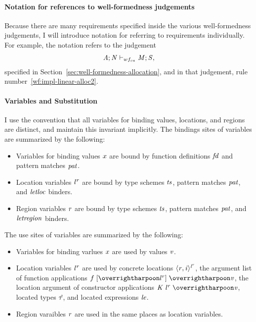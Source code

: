 \paragraph{Notation for references to well-formedness judgements}
Because there are many requirements specified inside the various
well-formedness judgements, I will introduce notation for referring
to requirements individually.
%
For example, the notation
refers to the judgement
\begin{align*}
\mathit{A};\mathit{N} \vdash_{wf_{ca}} \mathit{M};\mathit{S},
\end{align*}
specified in Section~\ref{sec:well-formedness-allocation},
and in that judgement, rule number~\ref{wf:impl-linear-alloc2}.


\paragraph{Variables and Substitution}
%
I use the convention that all variables for binding values,
locations, and regions are distinct, and maintain this invariant
implicitly.
%
The bindings sites of variables are summarized by the following:
%
\begin{itemize}
\item Variables for binding values $x$ are bound by function definitions
$\mathit{fd}$ and pattern matches $\mathit{pat}$.

\item Location variables ${\mathit{l}}^{\mathit{r}}$ are bound by type schemes $\mathit{ts}$, pattern matches
$\mathit{pat}$, and $\mathit{letloc}$ binders.

\item Region variables $\mathit{r}$ are bound by type schemes $\mathit{ts}$, pattern
matches $\mathit{pat}$, and $\mathit{letregion}$ binders.
\end{itemize}
%
The use sites of variables are summarized by the following:
\begin{itemize}
\item Variables for binding varlues $x$ are used by values $\mathit{v}$.

\item Location variables ${\mathit{l}}^{\mathit{r}}$ are used by concrete locations $\langle \mathit{r}, \mathit{i} \rangle ^{{\mathit{l}}^{\mathit{r}}}$,
the argument list of function applications
$\fapp{\overharpoon{\locreg{l}{r}}}{\overharpoon{\VAL}}$, the location
argument of constructor applications
$\datacon{\DC}{\keywd{\locreg{\loc}{\reg}}}{\overharpoon{\VAL}}$,
located types $\mathit{\hat{\tau}}$, and located expressions $\mathit{le}$.

\item Region varaibles $\mathit{r}$ are used in the same places as location variables.
\end{itemize}
